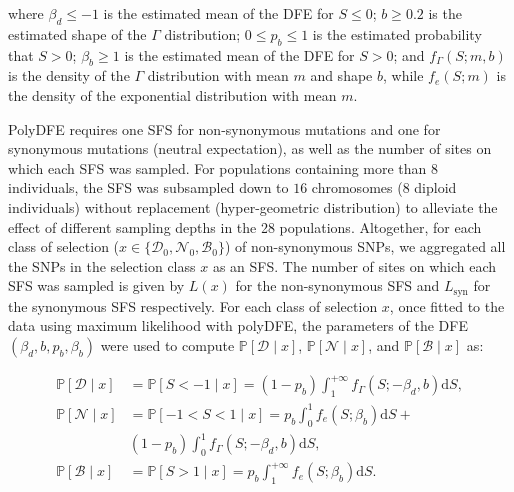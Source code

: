 \documentclass[9pt,twocolumn,twoside,lineno]{pnas-new}
\newcommand{\der}{\text{d}}
\newcommand{\proba}{\mathbb{P}}
\newcommand{\SphyDel}{\mathcal{D}_0}
\newcommand{\SphyNeu}{\mathcal{N}_0}
\newcommand{\SphyBen}{\mathcal{B}_0}
\newcommand{\Sphyclass}{x}
\newcommand{\given}{\mid}
\newcommand{\Spop}{S}
\newcommand{\SpopDel}{\mathcal{D}}
\newcommand{\SpopNeu}{\mathcal{N}}
\newcommand{\SpopBen}{\mathcal{B}}
\newcommand{\AdvMean}{\beta_b}
\newcommand{\DelMean}{\beta_d}
\begin{document}
{       where $\DelMean \leq -1 $ is the estimated mean of the DFE for $\Spop \leq 0$;
       $b \geq 0.2$ is the estimated shape of the $\Gamma$ distribution;
       $0 \leq p_b \leq 1$ is the estimated probability that $\Spop > 0$;
       $\AdvMean \geq 1$ is the estimated mean of the DFE for $\Spop > 0$;
       and $f_{\Gamma}(\Spop; m, b)$ is the density of the $\Gamma$ distribution with mean $m$ and shape $b$, while $f_{e}(\Spop; m)$ is the density of the exponential distribution with mean $m$.

       PolyDFE requires one SFS for non-synonymous mutations and one for synonymous mutations (neutral expectation), as well as the number of sites on which each SFS was sampled.
       For populations containing more than $8$ individuals, the SFS was subsampled down to $16$ chromosomes ($8$ diploid individuals) without replacement (hyper-geometric distribution) to alleviate the effect of different sampling depths in the 28 populations.
       Altogether, for each class of selection ($\Sphyclass \in \{\SphyDel, \SphyNeu, \SphyBen \}$) of non-synonymous SNPs, we aggregated all the SNPs in the selection class $\Sphyclass$ as an SFS.
       The number of sites on which each SFS was sampled is given by $L(\Sphyclass)$ for the non-synonymous SFS and $L_{\text{syn}}$ for the synonymous SFS respectively.
       For each class of selection $\Sphyclass$, once fitted to the data using maximum likelihood with polyDFE, the parameters of the DFE $\left( \DelMean , b, p_b, \AdvMean \right)$ were used to compute $\proba [ \SpopDel \given  \Sphyclass] $, $\proba [ \SpopNeu \given \Sphyclass]$, and $\proba [ \SpopBen \given \Sphyclass]$ as:

       \begin{align}
              \proba [ \SpopDel \given  \Sphyclass] &= \proba [ \Spop < -1 \given \Sphyclass ] = \left( 1 - p_b \right) \int_{1}^{+\infty} f_{\Gamma}(\Spop; -\DelMean, b) \der \Spop, \label{eq:polyProbaDel} \\
              \proba [ \SpopNeu \given \Sphyclass] &= \proba [ -1 < \Spop < 1 \given \Sphyclass ] = p_b \int_{0}^{1} f_{e}(\Spop; \AdvMean) \der \Spop + \\ \nonumber &\left( 1 - p_b \right) \int_{0}^{1} f_{\Gamma}(\Spop; -\DelMean, b) \der \Spop, \\
              \proba [ \SpopBen \given \Sphyclass] &= \proba [ \Spop > 1 \given \Sphyclass] = p_b \int_{1}^{+\infty} f_{e}(\Spop; \AdvMean) \der \Spop. \label{eq:polyProbaAdv}
       \end{align}

}
\end{document}
